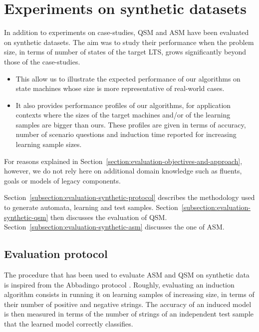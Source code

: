 \section{Experiments on synthetic datasets\label{section:evaluation-experiments-on-synthetic-data}}

In addition to experiments on case-studies, QSM and ASM have been evaluated on synthetic datasets. The aim was to study their performance when the problem size, in terms of number of states of the target LTS, grows significantly beyond those of the case-studies. 
\begin{itemize}
\item This allow us to illustrate the expected performance of our algorithms on state machines whose size is more representative of real-world cases. 
\item It also provides performance profiles of our algorithms, for application contexts where the sizes of the target machines and/or of the learning samples are bigger than ours. These profiles are given in terms of accuracy, number of scenario questions and induction time reported for increasing learning sample sizes.
\end{itemize}

For reasons explained in Section~\ref{section:evaluation-objectives-and-approach}, however, we do not rely here on additional domain knowledge such as fluents, goals or models of legacy components.

Section~\ref{subsection:evaluation-synthetic-protocol} describes the methodology used to generate automata, learning and test samples. Section~\ref{subsection:evaluation-synthetic-qsm} then discusses the evaluation of QSM. Section~\ref{subsection:evaluation-synthetic-asm} discusses the one of ASM.

\subsection{Evaluation protocol\label{subsection:evaluation-synthetic-protocol}}

The procedure that has been used to evaluate ASM and QSM on synthetic data is inspired from the Abbadingo protocol \cite{Lang:1998}. Roughly, evaluating an induction algorithm consists in running it on learning samples of increasing size, in terms of their number of positive and negative strings. The accuracy of an induced model is then measured in terms of the number of strings of an independent test sample that the learned model correctly classifies.

